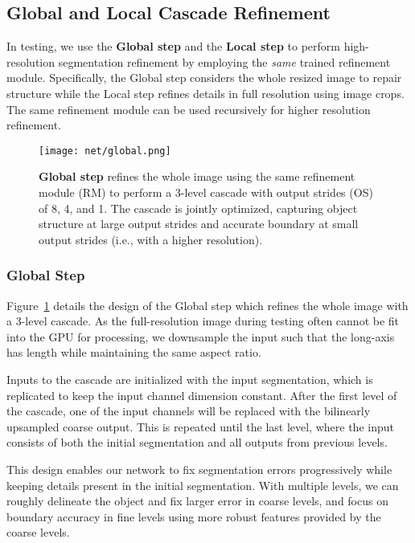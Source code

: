 \documentclass[10pt,twocolumn,letterpaper]{article}
\begin{document}
\subsection{Global and Local Cascade Refinement} \label{sec:cascade}
In testing, we use the \textbf{Global step} and the \textbf{Local step} to perform high-resolution segmentation refinement by employing the {\em same} trained refinement module. Specifically, the Global step considers the whole resized image to repair structure while the Local step refines details in full resolution using image crops. The same refinement module can be used recursively for higher resolution refinement.


\begin{figure}[t]
\begin{center}
    \texttt{[image: net/global.png]}
\end{center}
    \vspace{-0.15in}
	\caption{\textbf{Global step} refines the whole image using the same refinement module (RM) to perform a 3-level cascade with output strides (OS) of 8, 4, and 1. The cascade is jointly optimized, capturing object structure at large output strides and accurate boundary at small output strides (i.e., with a higher resolution).
	}
	\label{fig:global_fig}
	\vspace{-0.15in}
\end{figure}

\subsubsection{Global Step}
Figure~\ref{fig:global_fig} details the design of the Global step which refines the whole image with a 3-level cascade. As the full-resolution image during testing often cannot be fit into the GPU for processing, we downsample the input such that the long-axis has length  while maintaining the same aspect ratio. 

Inputs to the cascade are initialized with the input segmentation, which is replicated to keep the input channel dimension
constant. 
After the first level of the cascade, one of the input channels will be replaced with the bilinearly upsampled coarse output. 
This is repeated until the last level, where the input consists of both the initial segmentation and all outputs from previous levels. 

This design enables our network to fix segmentation errors progressively while keeping details present in the initial segmentation. 
With multiple levels, we can roughly delineate the object and fix larger error in coarse levels, and focus on boundary accuracy in fine levels using more robust features provided by the coarse levels. 
\end{document}
